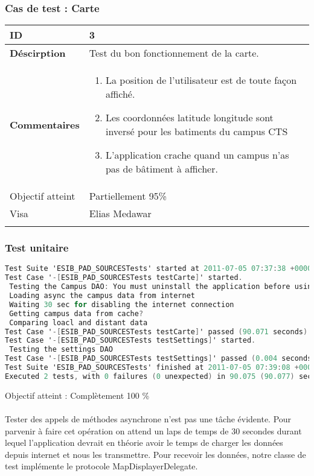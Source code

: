 		 		 \subsubsection*{Cas de test : Carte}
		 		 		 \begin{longtable}{m{4cm}|p{10cm}|}
		 		 		 \textbf{ ID} & 3 \\
		 		 		 \hline \textbf{Déscirption} &  Test du bon fonctionnement de la carte.\\
		 		 		 \hline \textbf{Commentaires} &  
		 		 		 	 	 \begin{enumerate}
	 		 		 		 	 		\item La position de l'utilisateur est de toute façon affiché.
	 		 							\item Les coordonnées latitude longitude sont inversé pour les batiments du campus CTS
	 		 							\item {\color{red}L'application crache quand un campus n'as pas de bâtiment à afficher}.
	 		 		 		 	\end{enumerate} \\
	 		 		 		  				\hline Objectif atteint & {\color{orange} Partiellement 95\% \XBox } \\
	 		 		 		  				\hline Visa & Elias Medawar 	\\
		 		 		 \\
		 		 \end{longtable} 
		 		 \subsubsection*{Test unitaire}
		 		 \begin{lstlisting}[language=C,caption = Log des test unitaires]
Test Suite 'ESIB_PAD_SOURCESTests' started at 2011-07-05 07:37:38 +0000
Test Case '-[ESIB_PAD_SOURCESTests testCarte]' started.
 Testing the Campus DAO: You must uninstall the application before using this test
 Loading async the campus data from internet
 Waiting 30 sec for disabling the internet connection
 Getting campus data from cache?
 Comparing loacl and distant data
Test Case '-[ESIB_PAD_SOURCESTests testCarte]' passed (90.071 seconds).
Test Case '-[ESIB_PAD_SOURCESTests testSettings]' started.
 Testing the settings DAO
Test Case '-[ESIB_PAD_SOURCESTests testSettings]' passed (0.004 seconds).
Test Suite 'ESIB_PAD_SOURCESTests' finished at 2011-07-05 07:39:08 +0000.
Executed 2 tests, with 0 failures (0 unexpected) in 90.075 (90.077) seconds
		 		 \end{lstlisting}
		 		Objectif atteint : {\color{green}Complètement 100 \% \CheckedBox}\\
		 		\\
		 		Tester des appels de méthodes asynchrone n'est pas une tâche évidente. Pour parvenir à faire cet opération on attend un laps de temps de 30 secondes durant lequel l'application devrait en théorie avoir le temps de charger les données depuis internet et nous les transmettre. Pour recevoir les données, notre classe de test implémente le protocole  MapDisplayerDelegate. 
